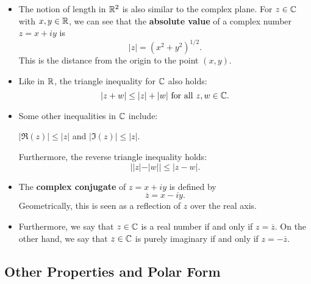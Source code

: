 \documentclass[11pt,a4paper]{book}
\begin{document}
\begin{itemize}
    \item The notion of length in \( \mathbb{R}^{2} \) is also similar to the complex plane. For \( z \in \mathbb{C}  \) with \( x,y \in \mathbb{R}  \), we can see that the \textbf{absolute value} of a complex number \( z = x + iy \) is
        \[  | z  |  = (x^{2} + y^{2})^{1/2}. \]
    This is the distance from the origin to the point \( (x,y) \).
    \item Like in \( \mathbb{R}  \), the triangle inequality for \( \mathbb{C}  \) also holds:
        \[  | z + w  |  \leq | z  |  + | w  | \  \text{for all} \ z,w \in \mathbb{C}.    \] 
    \item Some other inequalities in \( \mathbb{C}  \) include:
        \begin{center}
            \( | \Re(z) |  \leq | z  |  \) and \( | \Im(z)  |  \leq | z  |  \).
        \end{center}
        Furthermore, the reverse triangle inequality holds:
        \[  | | z |  - | w  |  | \leq | z - w  |. \]
    \item The \textbf{complex conjugate} of \( z = x + iy \) is defined by
        \[  \overline{z}=  x - iy. \]
        Geometrically, this is seen as a reflection of \( z  \) over the real axis.
    \item Furthermore, we say that \( z \in \mathbb{C}  \) is a real number if and only if \( z = \overline{z} \). On the other hand, we say that \( z \in \mathbb{C}  \) is purely imaginary if and only if \( z  = - \overline{z} \).
\end{itemize}

\subsection{Other Properties and Polar Form}
\end{document}
